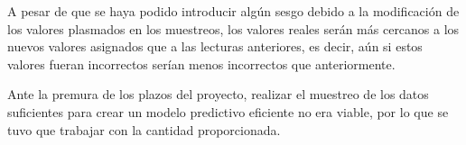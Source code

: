 A pesar de que se haya podido introducir algún sesgo debido a la modificación de los valores plasmados en los muestreos, 
los valores reales serán más cercanos a los nuevos valores asignados que a las lecturas anteriores, es decir, aún si 
estos valores fueran incorrectos serían menos incorrectos que anteriormente.

Ante la premura de los plazos del proyecto, realizar el muestreo de los datos suficientes para crear un modelo predictivo
eficiente no era viable, por lo que se tuvo que trabajar con la cantidad proporcionada.

